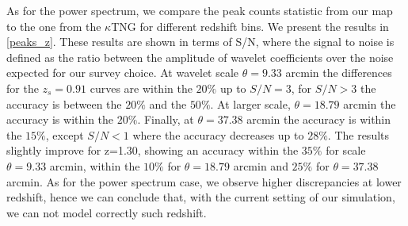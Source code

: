 \documentclass[twocolumn,twocolappendix]{aastex63}
\begin{document}
As for the power spectrum, we compare the peak counts statistic from our map to the one from the $\kappa$TNG for different redshift bins. We present the results in \autoref{peaks_z}. These results are shown in terms of S/N, where the signal to noise is defined as the ratio between the amplitude of wavelet coefficients over the noise expected for our survey choice.
At wavelet scale $\theta=9.33$ arcmin the differences for the $z_s=0.91$ curves are within the $20\%$ up to $S/N=3$, for $S/N>3$ the accuracy is between the $20\%$ and the $50\%$. At larger scale, $\theta=18.79$ arcmin the accuracy is within the $20\%$. Finally, at $\theta=37.38$ arcmin the accuracy is within the $15\%$, except $S/N<1$ where the accuracy decreases up to $28\%$.
The results slightly improve for z=1.30, showing an accuracy within the $35\%$ for scale $\theta=9.33$ arcmin,  within the $10\%$ for $\theta=18.79$ arcmin and $25\%$ for $\theta=37.38$ arcmin.
 As for the power spectrum case, we observe higher discrepancies at lower redshift, hence we can conclude that, with the current setting of our simulation, we can not model correctly such redshift.
\end{document}

